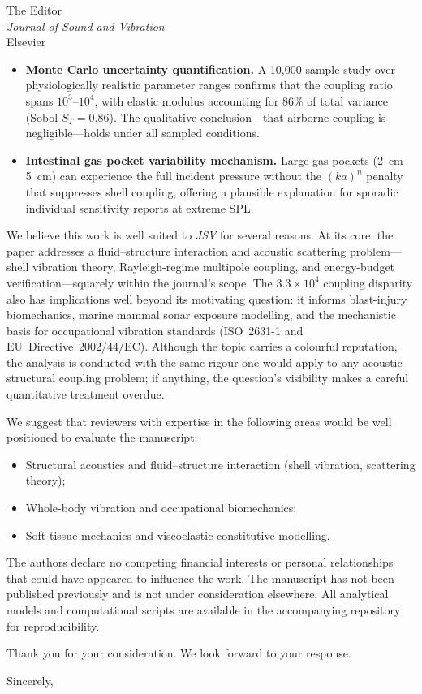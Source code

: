 \documentclass[11pt]{letter}
\begin{document}
\begin{letter}{%
  The Editor\\
  \textit{Journal of Sound and Vibration}\\
  Elsevier}
\begin{itemize}
  \item \textbf{Monte Carlo uncertainty quantification.}  A 10{,}000-sample
    study over physiologically realistic parameter ranges confirms
    that the coupling ratio spans $10^3$--$10^4$, with elastic modulus
    accounting for 86\% of total variance (Sobol $S_T = 0.86$).  The
    qualitative conclusion---that airborne coupling is negligible---holds
    under all sampled conditions.

  \item \textbf{Intestinal gas pocket variability mechanism.}  Large gas
    pockets (\SIrange{2}{5}{\centi\metre}) can experience the full incident
    pressure without the $(ka)^n$ penalty that suppresses shell coupling,
    offering a plausible explanation for sporadic individual sensitivity
    reports at extreme SPL.
\end{itemize}

We believe this work is well suited to \textit{JSV} for several reasons.
At its core, the paper addresses a fluid--structure interaction and
acoustic scattering problem---shell vibration theory, Rayleigh-regime
multipole coupling, and energy-budget verification---squarely within the
journal's scope.  The $3.3 \times 10^4$ coupling disparity also has
implications well beyond its motivating question: it informs blast-injury
biomechanics, marine mammal sonar exposure modelling, and the mechanistic
basis for occupational vibration standards (ISO~2631-1 and
EU~Directive~2002/44/EC).  Although the topic carries a colourful reputation,
the analysis is conducted with the same rigour one would apply to any
acoustic--structural coupling problem; if anything, the question's visibility
makes a careful quantitative treatment overdue.

We suggest that reviewers with expertise in the following areas would be
well positioned to evaluate the manuscript:
%
\begin{itemize}
  \item Structural acoustics and fluid--structure interaction (shell
    vibration, scattering theory);
  \item Whole-body vibration and occupational biomechanics;
  \item Soft-tissue mechanics and viscoelastic constitutive modelling.
\end{itemize}

The authors declare no competing financial interests or personal
relationships that could have appeared to influence the work.  The manuscript
has not been published previously and is not under consideration elsewhere.
All analytical models and computational scripts are available in the
accompanying repository for reproducibility.

Thank you for your consideration.  We look forward to your response.

\closing{Sincerely,}

\end{letter}
\end{document}
